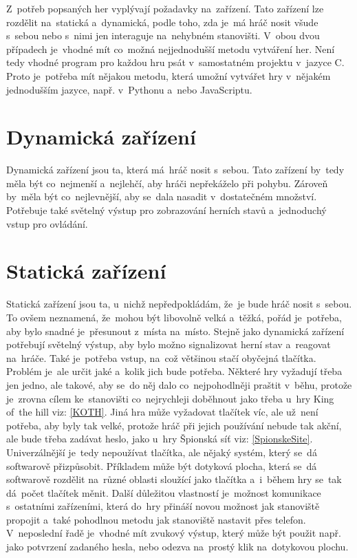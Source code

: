 Z~potřeb popsaných her vyplývají požadavky na~zařízení.
Tato zařízení lze rozdělit na~statická a~dynamická, podle toho, zda je~má hráč nosit všude s~sebou nebo s~nimi jen interaguje na~nehybném stanovišti.
V~obou dvou případech je~vhodné mít co~možná nejjednodušší metodu vytváření her.
Není tedy vhodné program pro každou hru psát v~samostatném projektu v~jazyce C.
Proto je~potřeba mít nějakou metodu, která umožní vytvářet hry v~nějakém jednodušším jazyce, např. v~Pythonu a~nebo JavaScriptu.

\section{Dynamická zařízení}
Dynamická zařízení jsou ta, která má~hráč nosit s~sebou.
Tato zařízení by~tedy měla být co~nejmenší a~nejlehčí, aby hráči nepřekáželo při pohybu.
Zároveň by~měla být co~nejlevnější, aby se~dala nasadit v~dostatečném množství.
Potřebuje také světelný výstup pro zobrazování herních stavů a~jednoduchý vstup pro ovládání. 

\section{Statická zařízení}
Statická zařízení jsou ta, u~nichž nepředpokládám, že~je bude hráč nosit s~sebou.
To ovšem neznamená, že~mohou být libovolně velká a~těžká, pořád je~potřeba, aby bylo snadné je~přesunout z~místa na~místo.
Stejně jako dynamická zařízení potřebují světelný výstup, aby bylo možno signalizovat herní stav a~reagovat na~hráče.
Také je~potřeba vstup, na~což většinou stačí obyčejná tlačítka.
Problém je~ale určit jaké a~kolik jich bude potřeba.
Některé hry vyžadují třeba jen jedno, ale takové, aby se~do něj dalo co~nejpohodlněji praštit v~běhu, protože je~zrovna cílem ke~stanovišti co~nejrychleji doběhnout jako třeba u~hry King of~the hill {viz: \ref{KOTH}}.
Jiná hra může vyžadovat tlačítek víc, ale už~není potřeba, aby byly tak velké, protože hráč při jejich používání nebude tak akční, ale bude třeba zadávat heslo, jako u~hry Špionská síť {viz: \ref{SpionskeSite}}.
Univerzálnější je~tedy nepoužívat tlačítka, ale nějaký systém, který se~dá softwarově přizpůsobit.
Příkladem může být dotyková plocha, která se~dá softwarově rozdělit na~různé oblasti sloužící jako tlačítka a~i~během hry se~tak dá~počet tlačítek měnit.
Další důležitou vlastností je~možnost komunikace s~ostatními zařízeními, která do~hry přináší novou možnost jak stanoviště propojit a~také pohodlnou metodu jak stanoviště nastavit přes telefon.
V~neposlední řadě je~vhodné mít zvukový výstup, který může být použit např. jako potvrzení zadaného hesla, nebo odezva na~prostý klik na~dotykovou plochu.

